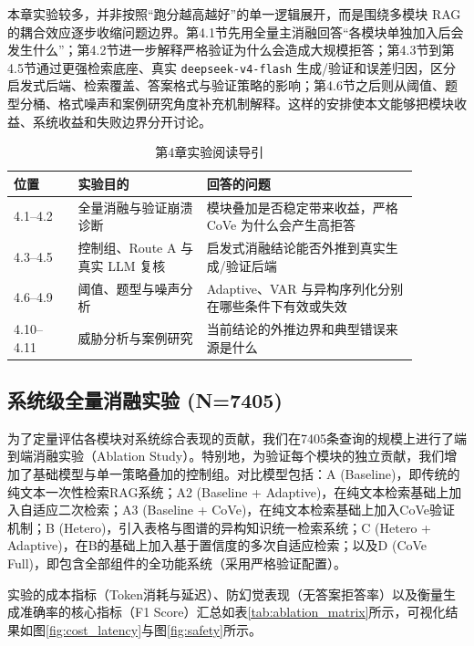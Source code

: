本章实验较多，并非按照“跑分越高越好”的单一逻辑展开，而是围绕多模块 RAG 的耦合效应逐步收缩问题边界。第4.1节先用全量主消融回答“各模块单独加入后会发生什么”；第4.2节进一步解释严格验证为什么会造成大规模拒答；第4.3节到第4.5节通过更强检索底座、真实 \texttt{deepseek-v4-flash} 生成/验证和误差归因，区分启发式后端、检索覆盖、答案格式与验证策略的影响；第4.6节之后则从阈值、题型分桶、格式噪声和案例研究角度补充机制解释。这样的安排使本文能够把模块收益、系统收益和失败边界分开讨论。

\begin{table}[!htbp]
\centering
\caption{第4章实验阅读导引}
\label{tab:chapter4_guide}
\small
\begin{tabular}{|p{0.14\linewidth}|p{0.28\linewidth}|p{0.46\linewidth}|}
\hline
\textbf{位置} & \textbf{实验目的} & \textbf{回答的问题} \\
\hline
4.1--4.2 & 全量消融与验证崩溃诊断 & 模块叠加是否稳定带来收益，严格 CoVe 为什么会产生高拒答 \\
\hline
4.3--4.5 & 控制组、Route A 与真实 LLM 复核 & 启发式消融结论能否外推到真实生成/验证后端 \\
\hline
4.6--4.9 & 阈值、题型与噪声分析 & Adaptive、VAR 与异构序列化分别在哪些条件下有效或失效 \\
\hline
4.10--4.11 & 威胁分析与案例研究 & 当前结论的外推边界和典型错误来源是什么 \\
\hline
\end{tabular}
\end{table}

\subsection{系统级全量消融实验 (N=7405)}
\vspace{-0.3\baselineskip}

为了定量评估各模块对系统综合表现的贡献，我们在7405条查询的规模上进行了端到端消融实验（Ablation Study）。特别地，为验证每个模块的独立贡献，我们增加了基础模型与单一策略叠加的控制组。对比模型包括：A (Baseline)，即传统的纯文本一次性检索RAG系统；A2 (Baseline + Adaptive)，在纯文本检索基础上加入自适应二次检索；A3 (Baseline + CoVe)，在纯文本检索基础上加入CoVe验证机制；B (Hetero)，引入表格与图谱的异构知识统一检索系统；C (Hetero + Adaptive)，在B的基础上加入基于置信度的多次自适应检索；以及D (CoVe Full)，即包含全部组件的全功能系统（采用严格验证配置）。

实验的成本指标（Token消耗与延迟）、防幻觉表现（无答案拒答率）以及衡量生成准确率的核心指标（F1 Score）汇总如表\ref{tab:ablation_matrix}所示，可视化结果如图\ref{fig:cost_latency}与图\ref{fig:safety}所示。

